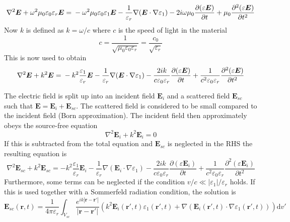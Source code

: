 \documentclass[11pt,twoside]{eitExjobb}
\begin{document}
	\begin{equation*}
		\nabla^2\bm{E} + \omega^2 \mu_0 \varepsilon_0 \varepsilon_r \bm{E} = \\
	-\omega^2 \mu_0 \varepsilon_0 \varepsilon_1 \bm{E} -\frac{1}{\varepsilon_r}\nabla(\bm{E} \cdot \nabla \varepsilon_1) - 2i\omega \mu_0 \frac{\partial (\varepsilon \bm{E})}{\partial t} + \mu_0 \frac{\partial^2 (\varepsilon \bm{E})}{\partial t^2}
	\end{equation*}
	Now $k$ is defined as $k = \omega/c$ where $c$ is the speed of light in the material
	\begin{equation*}
		c = \frac{1}{\sqrt{\mu_0 \varepsilon_0 \varepsilon_r}} = \frac{c_0}{\sqrt{\varepsilon_r}}
	\end{equation*}
	This is now used to obtain
	\begin{equation*}
		\nabla^2\bm{E} + k^2 \bm{E} = \\
		-k^2 \frac{\varepsilon_1}{\varepsilon_r} \bm{E} -\frac{1}{\varepsilon_r}\nabla(\bm{E} \cdot \nabla \varepsilon_1) - \frac{2ik}{c\varepsilon_0\varepsilon_r} \frac{\partial (\varepsilon \bm{E})}{\partial t} + \frac{1}{c^2 \varepsilon_0 \varepsilon_r} \frac{\partial^2 (\varepsilon \bm{E})}{\partial t^2}
	\end{equation*}

	The electric field is split up into an incident field $\bm{E}_i$ and a scattered field $\bm{E}_{sc}$ such that $\bm{E} = \bm{E}_i + \bm{E}_{sc}$. The scattered field is considered to be small compared to the incident field (Born approximation). The incident field then approximately obeys the source-free equation
	\begin{equation*}
		\nabla^2 \bm{E}_{i} + k^2 \bm{E}_{i} = 0
	\end{equation*}
	If this is subtracted from the total equation and $\bm{E}_{sc}$ is neglected in the RHS the resulting equation is
	\begin{equation*}
		\nabla^2\bm{E}_{sc} + k^2 \bm{E}_{sc} =	-k^2 \frac{\varepsilon_1}{\varepsilon_r} \bm{E}_i -\frac{1}{\varepsilon_r}\nabla(\bm{E}_i \cdot \nabla \varepsilon_1) - \frac{2ik}{c\varepsilon_0\varepsilon_r} \frac{\partial (\varepsilon \bm{E}_i)}{\partial t} + \frac{1}{c^2 \varepsilon_0 \varepsilon_r} \frac{\partial^2 (\varepsilon \bm{E}_i)}{\partial t^2}
	\end{equation*}
	Furthermore, some terms can be neglected if the condition $v/c \ll |\varepsilon_1|/\varepsilon_r$ holds. If this is used together with a Sommerfeld radiation condition, the solution is
	\begin{equation*}
		\bm{E}_{sc}(\bm{r},t) = \frac{1}{4\pi\varepsilon_r} \int_{V_{sc}} \frac{e^{ik |\bm{r}-\bm{r'}| }}{ |\bm{r}-\bm{r'}|} \left( k^2 \bm{E}_i (\bm{r'},t) \varepsilon_1 (\bm{r'},t) + \nabla (\bm{E}_i (\bm{r'},t) \cdot \nabla \varepsilon_1 (\bm{r'},t)) \right) \mathrm{d}v'
	\end{equation*}
	
\end{document}
